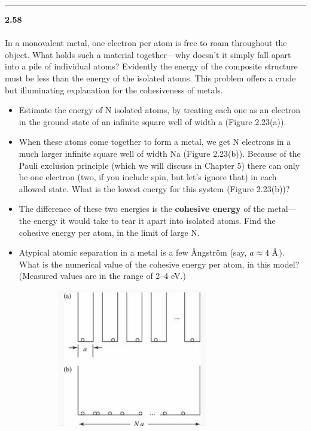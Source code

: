 \documentclass[fleqn]{article}
\begin{document}
  \rule{15cm}{1pt}
  
  \textbf{2.58} \\ \\
  In a monovalent metal, one electron per atom is free to roam
  throughout the object. What holds such a material together—why doesn’t it
  simply fall apart into a pile of individual atoms? Evidently the energy of the
  composite structure must be less than the energy of the isolated atoms. This
  problem offers a crude but illuminating explanation for the cohesiveness of
  metals.
  \begin{itemize}
    \item Estimate the energy of N isolated atoms, by treating each one as an
    electron in the ground state of an infinite square well of width a
    (Figure 2.23(a)).
    
    \item When these atoms come together to form a metal, we get N electrons in a
    much larger infinite square well of width Na (Figure 2.23(b)). Because of
    the Pauli exclusion principle (which we will discuss in Chapter 5) there
    can only be one electron (two, if you include spin, but let’s ignore that) in
    each allowed state. What is the lowest energy for this system
    (Figure 2.23(b))?

    \item The difference of these two energies is the \textbf{cohesive energy} of the metal—
    the energy it would take to tear it apart into isolated atoms. Find the
    cohesive energy per atom, in the limit of large N.


    \item Atypical atomic separation in a metal is a few Ångström (say, $a \approx 4 ~ \mbox{\normalfont\AA}$).
    What is the numerical value of the cohesive energy per atom, in this
    model? (Measured values are in the range of 2–4 eV.)

    \includegraphics[height=6cm, width=10cm]{one.JPG}
    
  \end{itemize}


  
\end{document}
